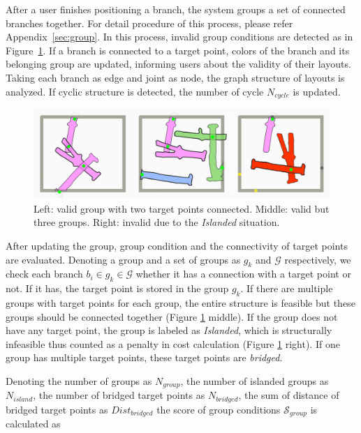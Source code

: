 After a user finishes positioning a branch, the system groups a set of connected branches together.
For detail procedure of this process, please refer Appendix~\ref{sec:group}.
In this process, invalid group conditions are detected as in Figure~\ref{fig:group}.
If a branch is connected to a target point, colors of the branch and its belonging group are updated, informing users about the validity of their layouts.
Taking each branch as edge and joint as node, the graph structure of layouts is analyzed.
If cyclic structure is detected, the number of cycle $N_{cycle}$ is updated.



\begin{figure}[ht]
  \begin{center}
    \includegraphics[width = 0.4\paperwidth]{images/interface/groups.jpg}
    \caption{Left: valid group with two target points connected. Middle: valid but three groups. Right: invalid due to the \textit{Islanded} situation. }
    \label{fig:group}
  \end{center}
\end{figure}

After updating the group, group condition and the connectivity of target points are evaluated.
Denoting a group and a set of groups as $g_k$ and $\mathcal{G}$ respectively, we check each branch $b_i \in g_k \in \mathcal{G}$ whether it has a connection with a target point or not.
If it has, the target point is stored in the group $g_k$.
If there are multiple groups with target points for each group, the entire structure is feasible but these groups should be connected together (Figure \ref{fig:group} middle).
If the group does not have any target point, the group is labeled as \textit{Islanded}, which is structurally infeasible thus counted as a penalty in cost calculation (Figure \ref{fig:group} right).
If one group has multiple target points, these target points are \textit{bridged}.

Denoting the number of groups as $N_{group}$, the number of islanded groups as $N_{island}$, the number of bridged target points as $N_{bridged}$, the sum of distance of bridged target points as $Dist_{bridged}$ the score of group conditions $\mathcal{S}_{group}$ is calculated as

